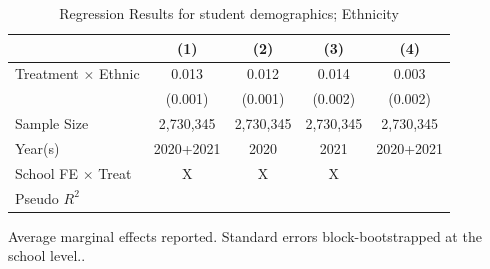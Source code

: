 \begin{table}[!h]
\centering
\caption{Regression Results for student demographics; Ethnicity}
\centering
\begin{threeparttable}
\begin{tabular}[t]{lcccc}
\toprule
 & (1) & (2) & (3) & (4)\\
\midrule
Treatment $\times$ Ethnic & 0.013 & 0.012 & 0.014 & 0.003\\
 & (0.001) & (0.001) & (0.002) & (0.002)\\
\midrule
Sample Size & 2,730,345 & 2,730,345 & 2,730,345 & 2,730,345\\
Year(s) & 2020+2021 & 2020 & 2021 & 2020+2021\\
School FE $\times$ Treat & X & X & X & \\
\addlinespace
Pseudo $R^{2}$ &  &  &  & \\
\bottomrule
\end{tabular}
\begin{tablenotes}
\item Average marginal effects reported. Standard errors block-bootstrapped at the school level..
\end{tablenotes}
\end{threeparttable}
\label{tab:ethnic}
\end{table}